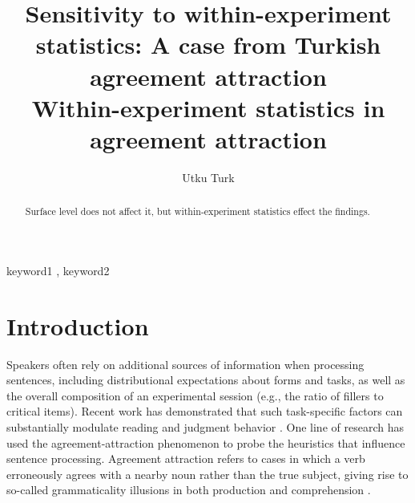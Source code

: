 \documentclass[
  authoryear,
  preprint]{elsarticle}
\begin{document}
\begin{frontmatter}
\title{Sensitivity to within-experiment statistics: A case from Turkish
agreement attraction \\\large{Within-experiment statistics in agreement
attraction} }
\author[1]{Utku Turk%
%
}



        
\begin{abstract}
Surface level does not affect it, but within-experiment statistics
effect the findings.
\end{abstract}





\begin{keyword}
    keyword1 \sep 
    keyword2
\end{keyword}
\end{frontmatter}
    

\section{Introduction}\label{introduction}

Speakers often rely on additional sources of information when processing
sentences, including distributional expectations about forms and tasks,
as well as the overall composition of an experimental session (e.g., the
ratio of fillers to critical items). Recent work has demonstrated that
such task-specific factors can substantially modulate reading and
judgment behavior
\citep{LauraMalsbug24, ArehalliWittenberg2021, HammerlyEtAl2019, LogacevVasishth2016}.
One line of research has used the agreement-attraction phenomenon to
probe the heuristics that influence sentence processing. Agreement
attraction refers to cases in which a verb erroneously agrees with a
nearby noun rather than the true subject, giving rise to so-called
grammaticality illusions in both production and comprehension
\citep{BockMiller:1991, PearlmutterGarnseyBock:1999}.

\begin{exe}
\end{exe}
\end{document}
